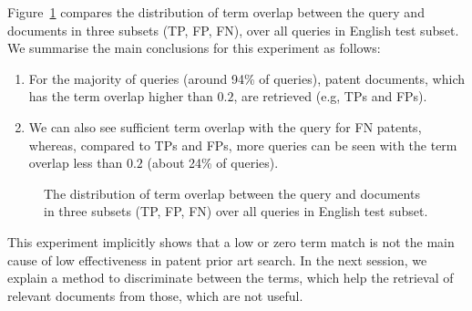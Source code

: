 Figure~\ref{fig:overlap} compares the distribution of term overlap between the query and documents in three subsets (TP, FP, FN), over all queries in English test subset. We summarise the main conclusions for this experiment as follows:
\begin{enumerate}
\item For the majority of queries (around 94\% of queries), patent documents, which has the term overlap higher than $0.2$, are retrieved (e.g, TPs and FPs). 
\item We can also see sufficient term overlap with the query for FN patents, whereas, compared to TPs and FPs, more queries can be seen with the term overlap less than $ 0.2 $ (about 24\% of queries). 
\end{enumerate}
\begin{figure}[t!]
\begin{centering}
\par\end{centering}

\protect\caption{The distribution of term overlap between the query and documents in three subsets (TP, FP, FN) over all queries in English test subset.}
\label{fig:overlap}
\end{figure}
This experiment implicitly shows that a low or zero term match is not the main cause of low effectiveness in patent prior art search. In the next session, we explain a method to discriminate between the terms, which help the retrieval of relevant documents from those, which are not useful. 
